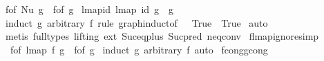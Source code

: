 \begin{isabellebody}
{\isacharbar}{\kern0pt}\ {\isachardoublequoteopen}f{\isacharunderscore}{\kern0pt}of\ {\isacharparenleft}{\kern0pt}Nu\ g{\isacharparenright}{\kern0pt}\ {\isacharequal}{\kern0pt}\ f{\isacharunderscore}{\kern0pt}of\ g{\isachardoublequoteclose}\isanewline
\isanewline
\isanewline
\isanewline
{}\isamarkupfalse%
\ lmap{\isacharunderscore}{\kern0pt}id{\isacharcolon}{\kern0pt}\ {\isachardoublequoteopen}lmap\ id\ g\ {\isacharequal}{\kern0pt}\ g{\isachardoublequoteclose}\isanewline
%
\isadelimproof
%
\endisadelimproof
%
\isatagproof
{}\isamarkupfalse%
\ {\isacharparenleft}{\kern0pt}induct\ g\ arbitrary{\isacharcolon}{\kern0pt}\ f\ rule{\isacharcolon}{\kern0pt}\ graph{\isachardot}{\kern0pt}induct{\isacharbrackleft}{\kern0pt}of\ {\isacharunderscore}{\kern0pt}\ {\isachardoublequoteopen}{\isacharpercent}{\kern0pt}{\isacharunderscore}{\kern0pt}{\isachardot}{\kern0pt}\ True{\isachardoublequoteclose}\ {\isachardoublequoteopen}{\isacharpercent}{\kern0pt}{\isacharunderscore}{\kern0pt}{\isachardot}{\kern0pt}\ True{\isachardoublequoteclose}{\isacharbrackright}{\kern0pt}{\isacharparenright}{\kern0pt}\isanewline
{}\isamarkupfalse%
\ auto\isanewline
{}\isamarkupfalse%
\ {\isacharparenleft}{\kern0pt}metis\ {\isacharparenleft}{\kern0pt}full{\isacharunderscore}{\kern0pt}types{\isacharcomma}{\kern0pt}\ lifting{\isacharparenright}{\kern0pt}\ ext\ Suc{\isacharunderscore}{\kern0pt}eq{\isacharunderscore}{\kern0pt}plus{}\ Suc{\isacharunderscore}{\kern0pt}pred{\isacharprime}{\kern0pt}\ neq{}{\isacharunderscore}{\kern0pt}conv{\isacharparenright}{\kern0pt}%
\endisatagproof
{\isafoldproof}%
%
\isadelimproof
\isanewline
%
\endisadelimproof
\isanewline
\isanewline
{}\isamarkupfalse%
\ f{\isacharunderscore}{\kern0pt}lmap{\isacharunderscore}{\kern0pt}ignore{\isacharbrackleft}{\kern0pt}simp{\isacharbrackright}{\kern0pt}{\isacharcolon}{\kern0pt}\isanewline
\ \ {\isachardoublequoteopen}f{\isacharunderscore}{\kern0pt}of\ {\isacharparenleft}{\kern0pt}lmap\ f\ g{\isacharparenright}{\kern0pt}\ {\isacharequal}{\kern0pt}\ f{\isacharunderscore}{\kern0pt}of\ g{\isachardoublequoteclose}\isanewline
%
\isadelimproof
%
\endisadelimproof
%
\isatagproof
{}\isamarkupfalse%
\ {\isacharparenleft}{\kern0pt}induct\ g\ arbitrary{\isacharcolon}{\kern0pt}\ f{\isacharparenright}{\kern0pt}\ auto%
\endisatagproof
{\isafoldproof}%
%
\isadelimproof
\isanewline
%
\endisadelimproof
\isanewline
\isanewline
{}\isamarkupfalse%
\ f{\isacharunderscore}{\kern0pt}cong{\isacharunderscore}{\kern0pt}gcong{\isacharcolon}{\kern0pt}\isanewline

\end{isabellebody}
